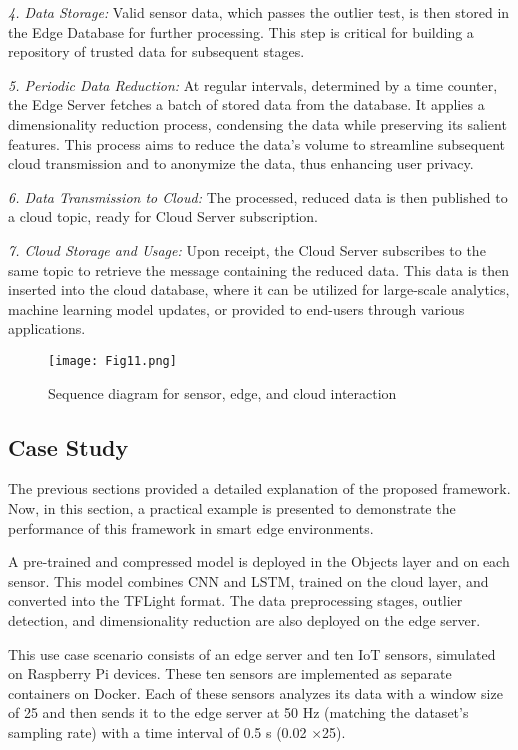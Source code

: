 \documentclass[11pt]{article}
\begin{document}
	\textit{4. Data Storage:} Valid sensor data, which passes the outlier test, is then stored in the Edge Database for further processing. This step is critical for building a repository of trusted data for subsequent stages.
	
	\textit{5. Periodic Data Reduction:} At regular intervals, determined by a time counter, the Edge Server fetches a batch of stored data from the database. It applies a dimensionality reduction process, condensing the data while preserving its salient features. This process aims to reduce the data's volume to streamline subsequent cloud transmission and to anonymize the data, thus enhancing user privacy.
	
	\textit{6. Data Transmission to Cloud:} The processed, reduced data is then published to a cloud topic, ready for Cloud Server subscription.
	
	\textit{7. Cloud Storage and Usage:} Upon receipt, the Cloud Server subscribes to the same topic to retrieve the message containing the reduced data. This data is then inserted into the cloud database, where it can be utilized for large-scale analytics, machine learning model updates, or provided to end-users through various applications.	
	
	\begin{figure}[t]
		\centering
		\texttt{[image: Fig11.png]}
		\caption{ Sequence diagram for sensor, edge, and cloud interaction}
	\end{figure}
	
	\subsection{Case Study}
	The previous sections provided a detailed explanation of the proposed framework.
	Now, in this section, a practical example is presented to demonstrate the performance of this framework in smart edge environments.
	
	A pre-trained and compressed model is deployed in the Objects layer and on each
	sensor. This model combines CNN and LSTM, trained on the cloud layer, and converted into the TFLight format. The data preprocessing stages, outlier detection, and
	dimensionality reduction are also deployed on the edge server.
	
	This use case scenario consists of an edge server and ten IoT sensors, simulated
	on Raspberry Pi devices. These ten sensors are implemented as separate containers
	on Docker. Each of these sensors analyzes its data with a window size of 25 and
	then sends it to the edge server at 50 Hz (matching the dataset’s sampling rate) with
	a time interval of 0.5 s (0.02 ×25).
	
\end{document}
